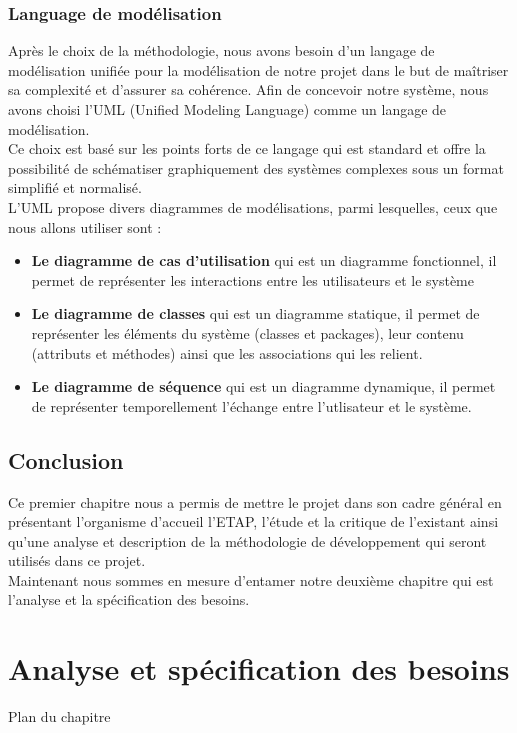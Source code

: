 \documentclass[12pt]{report}
\begin{document}
\subsection{Language de modélisation}
Après le choix de la méthodologie, nous avons besoin d'un langage de modélisation unifiée pour la modélisation de notre projet dans le but de maîtriser sa complexité et d'assurer sa cohérence. Afin de concevoir notre système, nous avons choisi l'UML (Unified Modeling Language) comme un langage de modélisation.\\[9pt]
Ce choix est basé sur les points forts de ce langage qui est standard et offre la possibilité de schématiser graphiquement des systèmes complexes sous un format simplifié et normalisé. \\[9pt]
L'UML propose divers diagrammes de modélisations, parmi lesquelles, ceux que nous allons utiliser sont :
\begin{itemize}[label={$\surd$}]
	\item \textbf{Le diagramme de cas d'utilisation} qui est un diagramme fonctionnel, il permet de représenter les interactions entre les utilisateurs et le système\\
	\item \textbf{Le diagramme de classes} qui est un diagramme statique, il permet de représenter les éléments du système (classes et packages), leur contenu (attributs et méthodes) ainsi que les associations qui les relient.
	\item \textbf{Le diagramme de séquence} qui est un diagramme dynamique, il permet de représenter temporellement l'échange entre l'utlisateur et le système.
\end{itemize}

\section*{Conclusion}
Ce premier chapitre nous a permis de mettre le projet dans son cadre général en présentant l'organisme d'accueil l'ETAP, l'étude et la critique de l'existant ainsi qu'une analyse et description de la méthodologie de développement qui seront utilisés dans ce projet.\\[9pt]
Maintenant nous sommes en mesure d'entamer notre deuxième chapitre qui est l'analyse et la spécification des besoins.
\chapter{Analyse et spécification des besoins}
\vspace{100pt}
\begin{center}
Plan du chapitre
\end{center}
\end{document}
